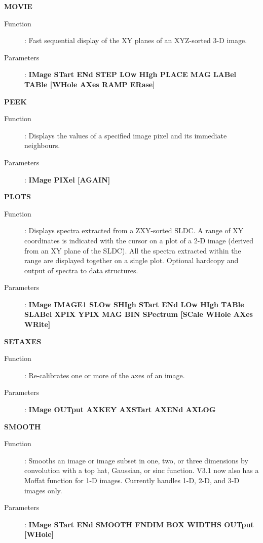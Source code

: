 {\large\bf MOVIE \hfill}
\begin{description}
\item[Function]:
Fast sequential display of the XY planes of an XYZ-sorted 3-D image.
\item[Parameters]:
{\bf IMage STart ENd STEP LOw HIgh PLACE MAG LABel TABle [WHole AXes RAMP 
ERase]}
\end{description}
\vspace{5mm}

{\large\bf PEEK \hfill}
\begin{description}
\item[Function]: 
Displays the values of a specified image pixel and its immediate neighbours.
\item[Parameters]: 
{\bf IMage PIXel [AGAIN]}
\end{description}
\vspace{5mm}

{\large\bf PLOTS \hfill}
\begin{description}
\item[Function]:
Displays spectra extracted from a ZXY-sorted SLDC. A range of XY coordinates is
indicated with the cursor on a plot of a 2-D image (derived from an XY plane of
the SLDC). All the spectra extracted within the range are displayed together on
a single plot. Optional hardcopy and output of spectra to data structures.
\item[Parameters]:
{\bf IMage IMAGE1 SLOw SHIgh STart ENd LOw HIgh TABle SLABel XPIX YPIX MAG BIN
SPectrum [SCale WHole AXes WRite]}
\end{description}

{\large\bf SETAXES \hfill}
\begin{description}
\item[Function]: 
Re-calibrates one or more of the axes of an image.
\item[Parameters]: 
{\bf IMage OUTput AXKEY AXSTart AXENd AXLOG}
\end{description}
\vspace{5mm}

{\large\bf SMOOTH \hfill}
\begin{description}
\item[Function]: 
Smooths an image or image subset in one, two, or three dimensions by 
convolution with a top hat, Gaussian, or sinc function. V3.1 now also has a 
Moffat function for 1-D images. Currently handles 1-D, 2-D, and 3-D images only.
\item[Parameters]: 
{\bf IMage STart ENd SMOOTH FNDIM BOX WIDTHS OUTput [WHole]}
\end{description}
\vspace{5mm}

